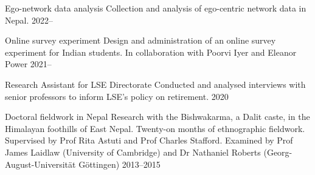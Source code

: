 
\begin{cvexperiences}

  \cvexperience
    {Ego-network data analysis} %
    {Collection and analysis of ego-centric network data in Nepal.} %
    {2022--} %

  \cvexperience
    {Online survey experiment} %
    {Design and administration of an online survey experiment for Indian students. In collaboration with Poorvi Iyer and Eleanor Power} %
    {2021--} %

  \cvexperience
    {Research Assistant for LSE Directorate} %
    {Conducted and analysed interviews with senior professors to inform LSE's policy on retirement.} %
    {2020} %


  \cvexperience
    {Doctoral fieldwork in Nepal} %
    {Research with the Bishwakarma, a Dalit caste, in the Himalayan foothills of East Nepal. Twenty-on months of ethnographic fieldwork. Supervised by Prof Rita Astuti and Prof Charles Stafford. Examined by Prof James Laidlaw (University of Cambridge) and Dr Nathaniel Roberts (Georg-August-Universität Göttingen)} %
    {2013--2015} %

\end{cvexperiences}
